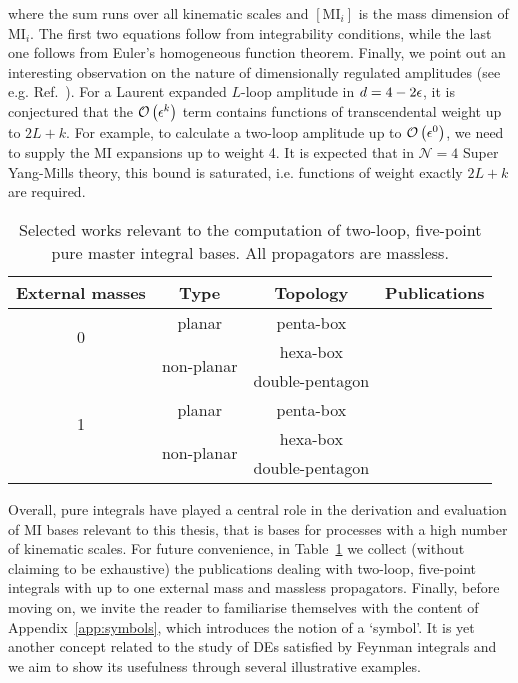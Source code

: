 \documentclass[main.tex]{subfiles}
\begin{document}
where the sum runs over all kinematic scales and $[\text{MI}_i]$ is the mass dimension of MI$_i$. The first two equations follow from integrability conditions, while the last one follows from Euler's homogeneous function theorem. Finally, we point out an interesting observation on the nature of dimensionally regulated amplitudes (see e.g. Ref.~\cite{Duhr:2014woa}). For a Laurent expanded $L$-loop amplitude in $d = 4- 2\epsilon$, it is conjectured that the $\mathcal{O}\left(\epsilon^k\right)$ term contains functions of transcendental weight up to $2L+k$. For example, to calculate a two-loop amplitude up to $\mathcal{O}\left(\epsilon^0\right)$, we need to supply the MI expansions up to weight 4. It is expected that in $\mathcal{N}=4$ Super Yang-Mills theory, this bound is saturated, i.e. functions of weight exactly $2L+k$ are required.
\begin{table}[t]
	\begin{center}
		\begin{tabular}{|c|c|c|c|}
            \hline
            External masses & Type & Topology & Publications \\
			\hline
            \multirow{2}{0cm}{0} & planar & penta-box & \cite{Gehrmann:2015bfy,Papadopoulos:2015jft, Gehrmann:2018yef, Abreu:2018aqd, Chicherin:2020oor} \\
            \cline{2-4}
            & \multirow{2}{2cm}{non-planar} & hexa-box & \cite{Chicherin:2018mue, Chicherin:2017dob, Chicherin:2018ubl, Chicherin:2018wes, Abreu:2018rcw, Chicherin:2020oor, Abreu:2018aqd} \\
            & & double-pentagon & \cite{Chicherin:2018old, Abreu:2018aqd, Chicherin:2020oor} \\
            \hline
            \multirow{2}{0cm}{1} & planar & penta-box & \cite{Papadopoulos:2015jft, Abreu:2020jxa, Chicherin:2021dyp, Canko:2020ylt} \\
            \cline{2-4}
            & \multirow{2}{2cm}{non-planar} & hexa-box & \cite{abreu2021twoloop, Kardos:2022tpo, Papadopoulos:2019iam, Chicherin:2021dyp} \\
            & & double-pentagon & \cite{Abreu:2023rco} \\
            \hline
		\end{tabular}
\end{center}
\caption{Selected works relevant to the computation of two-loop, five-point pure master integral bases. All propagators are massless.}
\label{tab:MIs}
\end{table}

Overall, pure integrals have played a central role in the derivation and evaluation of MI bases relevant to this thesis, that is bases for processes with a high number of kinematic scales. For future convenience, in Table~\ref{tab:MIs} we collect (without claiming to be exhaustive) the publications dealing with two-loop, five-point integrals with up to one external mass and massless propagators. Finally, before moving on, we invite the reader to familiarise themselves with the content of Appendix~\ref{app:symbols}, which introduces the notion of a `symbol'. It is yet another concept related to the study of DEs satisfied by Feynman integrals and we aim to show its usefulness through several illustrative examples.
\end{document}
